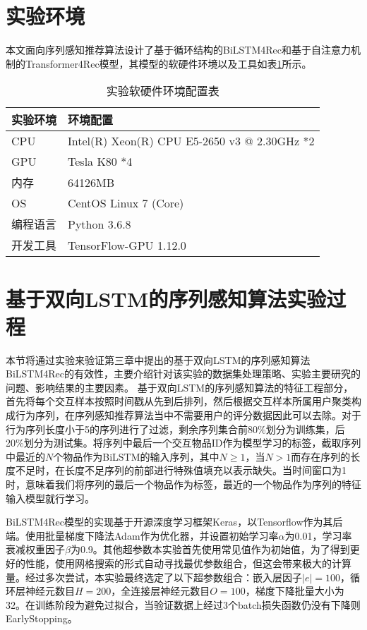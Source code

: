 \section{实验环境}
本文面向序列感知推荐算法设计了基于循环结构的BiLSTM4Rec和基于自注意力机制的Transformer4Rec模型，其模型的软硬件环境以及工具如表\ref{tab:set}所示。
\begin{table}[H]
\centering
\caption{实验软硬件环境配置表}
\label{tab:set}
  \begin{tabular}{@{}ll@{}}
  \toprule
  实验环境 & 环境配置                                  \\ \midrule
  CPU  & Intel(R) Xeon(R) CPU E5-2650 v3 @ 2.30GHz *2 \\
  GPU  & Tesla K80 *4                                 \\
  内存   & 64126MB                                      \\
  OS   & CentOS Linux 7 (Core)                        \\
  编程语言 & Python 3.6.8                                 \\
  开发工具 & TensorFlow-GPU 1.12.0                        \\ \bottomrule
  \end{tabular}
\end{table}

\section{基于双向LSTM的序列感知算法实验过程}

本节将通过实验来验证第三章中提出的基于双向LSTM的序列感知算法BiLSTM4Rec的有效性，主要介绍针对该实验的数据集处理策略、实验主要研究的问题、影响结果的主要因素。
基于双向LSTM的序列感知算法的特征工程部分，首先将每个交互样本按照时间戳从先到后排列，然后根据交互样本所属用户聚类构成行为序列，在序列感知推荐算法当中不需要用户的评分数据因此可以去除。对于行为序列长度小于5的序列进行了过滤，剩余序列集合前80\%划分为训练集，后20\%划分为测试集。将序列中最后一个交互物品ID作为模型学习的标签，截取序列中最近的$N$个物品作为BiLSTM的输入序列，其中$N\geq 1$，当$N>1$而存在序列的长度不足时，在长度不足序列的前部进行特殊值填充以表示缺失。当时间窗口为1时，意味着我们将序列的最后一个物品作为标签，最近的一个物品作为序列的特征输入模型就行学习。

BiLSTM4Rec模型的实现基于开源深度学习框架Keras，以Tensorflow作为其后端。使用批量梯度下降法Adam作为优化器，并设置初始学习率$\alpha$为0.01，学习率衰减权重因子$\beta$为0.9。其他超参数本实验首先使用常见值作为初始值，为了得到更好的性能，使用网格搜索的形式自动寻找最优参数组合，但这会带来极大的计算量。经过多次尝试，本实验最终选定了以下超参数组合：嵌入层因子$|e|=100$，循环层神经元数目$H=200$，全连接层神经元数目$O=100$，梯度下降批量大小为32。在训练阶段为避免过拟合，当验证数据上经过3个batch损失函数仍没有下降则EarlyStopping。


